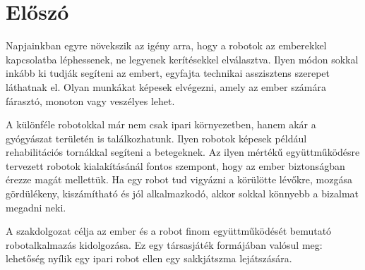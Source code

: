 \documentclass[../documentation.tex]{subfiles}
\begin{document}
\section*{Előszó}
Napjainkban egyre növekszik az igény arra, hogy a robotok az emberekkel kapcsolatba léphessenek, ne legyenek kerítésekkel elválasztva. Ilyen módon sokkal inkább ki tudják segíteni az embert, egyfajta technikai asszisztens szerepet láthatnak el. Olyan munkákat képesek elvégezni, amely az ember számára fárasztó, monoton vagy veszélyes lehet. 

A különféle robotokkal már nem csak ipari környezetben, hanem akár a gyógyászat területén is találkozhatunk. Ilyen robotok képesek például rehabilitációs tornákkal segíteni a betegeknek. Az ilyen mértékű együttműködésre tervezett robotok kialakításánál fontos szempont, hogy az ember biztonságban érezze magát mellettük. Ha egy robot tud vigyázni a körülötte lévőkre, mozgása gördülékeny, kiszámítható és jól alkalmazkodó, akkor sokkal könnyebb a bizalmat megadni neki.

A szakdolgozat célja az ember és a robot finom együttműködését bemutató robotalkalmazás kidolgozása. Ez egy társasjáték formájában valósul meg: lehetőség nyílik egy ipari robot ellen egy sakkjátszma lejátszására.
\end{document}
